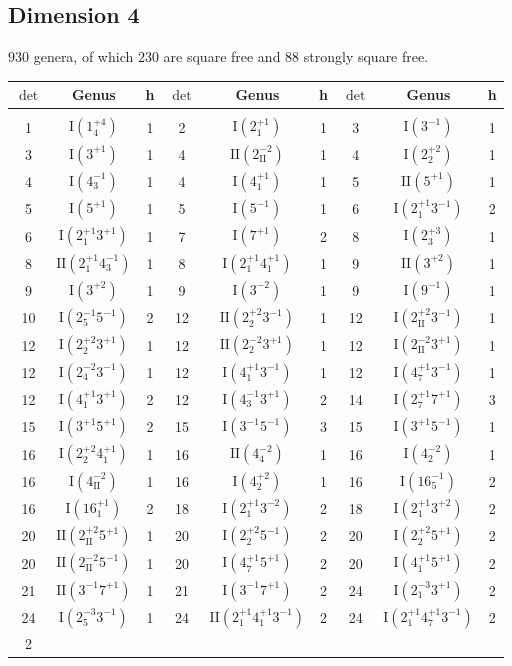 \documentclass{amsart}
\theoremstyle{definition}
\theoremstyle{remark}
\begin{document}
\subsection{Dimension 4} $930$ genera, of which $230$ are square free and 88 strongly square free.
\setlength{\tabcolsep}{0.81mm} 
\begin{center}
 \begin{longtable}{ccc|ccc|ccc}
  $\det$ & Genus & h & $\det$ & Genus & h & $\det$ & Genus & h \\
  \hline
  & & & & & & & & \\
1&$\mathrm{I}(1_{4}^{+4})$&1&2&$\mathrm{I}(2_{1}^{+1})$&1&3&$\mathrm{I}(3^{-1})$&1\\3&$\mathrm{I}(3^{+1})$&1&4&$\mathrm{II}(2_{\mathrm{II}}^{-2})$&1&4&$\mathrm{I}(2_{2}^{+2})$&1\\4&$\mathrm{I}(4_{3}^{-1})$&1&4&$\mathrm{I}(4_{1}^{+1})$&1&5&$\mathrm{II}(5^{+1})$&1\\5&$\mathrm{I}(5^{+1})$&1&5&$\mathrm{I}(5^{-1})$&1&6&$\mathrm{I}(2_{1}^{+1}3^{-1})$&2\\6&$\mathrm{I}(2_{1}^{+1}3^{+1})$&1&7&$\mathrm{I}(7^{+1})$&2&8&$\mathrm{I}(2_{3}^{+3})$&1\\8&$\mathrm{II}(2_{1}^{+1}4_{3}^{-1})$&1&8&$\mathrm{I}(2_{1}^{+1}4_{1}^{+1})$&1&9&$\mathrm{II}(3^{+2})$&1\\9&$\mathrm{I}(3^{+2})$&1&9&$\mathrm{I}(3^{-2})$&1&9&$\mathrm{I}(9^{-1})$&1\\10&$\mathrm{I}(2_{5}^{-1}5^{-1})$&2&12&$\mathrm{II}(2_{2}^{+2}3^{-1})$&1&12&$\mathrm{I}(2_{\mathrm{II}}^{+2}3^{-1})$&1\\12&$\mathrm{I}(2_{2}^{+2}3^{+1})$&1&12&$\mathrm{II}(2_{2}^{-2}3^{+1})$&1&12&$\mathrm{I}(2_{\mathrm{II}}^{-2}3^{+1})$&1\\12&$\mathrm{I}(2_{4}^{-2}3^{-1})$&1&12&$\mathrm{I}(4_{1}^{+1}3^{-1})$&1&12&$\mathrm{I}(4_{7}^{+1}3^{-1})$&1\\12&$\mathrm{I}(4_{1}^{+1}3^{+1})$&2&12&$\mathrm{I}(4_{3}^{-1}3^{+1})$&2&14&$\mathrm{I}(2_{7}^{+1}7^{+1})$&3\\15&$\mathrm{I}(3^{+1}5^{+1})$&2&15&$\mathrm{I}(3^{-1}5^{-1})$&3&15&$\mathrm{I}(3^{+1}5^{-1})$&1\\16&$\mathrm{I}(2_{2}^{+2}4_{1}^{+1})$&1&16&$\mathrm{II}(4_{4}^{-2})$&1&16&$\mathrm{I}(4_{2}^{-2})$&1\\16&$\mathrm{I}(4_{\mathrm{II}}^{-2})$&1&16&$\mathrm{I}(4_{2}^{+2})$&1&16&$\mathrm{I}(16_{5}^{-1})$&2\\16&$\mathrm{I}(16_{1}^{+1})$&2&18&$\mathrm{I}(2_{1}^{+1}3^{-2})$&2&18&$\mathrm{I}(2_{1}^{+1}3^{+2})$&2\\20&$\mathrm{II}(2_{\mathrm{II}}^{+2}5^{+1})$&1&20&$\mathrm{I}(2_{2}^{+2}5^{-1})$&2&20&$\mathrm{I}(2_{2}^{+2}5^{+1})$&2\\20&$\mathrm{II}(2_{\mathrm{II}}^{-2}5^{-1})$&1&20&$\mathrm{I}(4_{7}^{+1}5^{+1})$&2&20&$\mathrm{I}(4_{1}^{+1}5^{+1})$&2\\21&$\mathrm{II}(3^{-1}7^{+1})$&1&21&$\mathrm{I}(3^{-1}7^{+1})$&2&24&$\mathrm{I}(2_{1}^{-3}3^{+1})$&2\\24&$\mathrm{I}(2_{5}^{-3}3^{-1})$&1&24&$\mathrm{II}(2_{1}^{+1}4_{1}^{+1}3^{-1})$&2&24&$\mathrm{I}(2_{1}^{+1}4_{7}^{+1}3^{-1})$&2\\2
\end{longtable}
\end{center}
\end{document}
